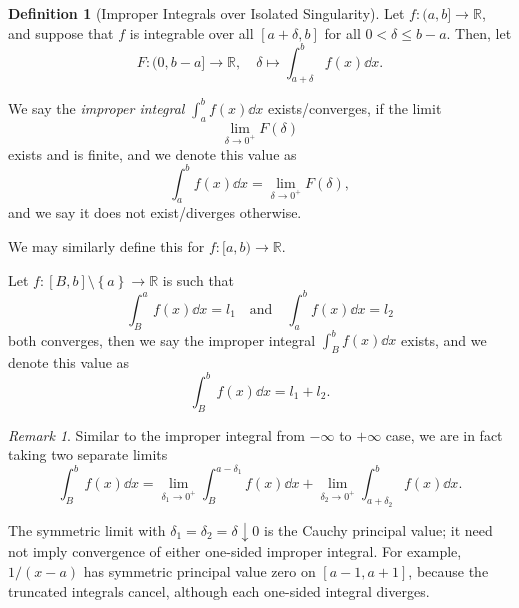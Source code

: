 \documentclass[11pt]{article}
\numberwithin{equation}{section}
\theoremstyle{definition}
\newtheorem{definition}[theorem]{Definition}
\theoremstyle{remark}
\newtheorem{remark}[theorem]{Remark}
\newcommand{\pqty}[1]{\left(#1\right)}
\newcommand{\Bqty}[1]{\left\{#1\right\}}
\newcommand{\ccintv}[2]{[#1,#2]}
\newcommand{\cointv}[2]{[#1,#2)}
\newcommand{\ocintv}[2]{(#1,#2]}
\newcommand{\functiondomain}[3]{#1:#2\to #3}
\newcommand{\function}[5]{#1:#2\to #3,\quad #4\mapsto #5}
\newcommand{\RR}{\mathbb R}
\newcommand{\plusinfty}{+\infty}
\newcommand{\minusinfty}{-\infty}
\newcommand{\qand}{\quad\text{and}\quad}
\begin{document}
\begin{definition}[Improper Integrals over Isolated Singularity]\label{analysis-unit-0194}
    \label{def:improper-integral-isolated-singularity}%
    Let \(\functiondomain{f}{\ocintv{a}{b}}{\RR}\), and suppose that \(f\) is integrable over all \(\ccintv{a + \delta}{b}\) for all \(0 < \delta \leq b - a\). Then, let
    \[
        \function{F}{\ocintv{0}{b - a}}{\RR}{\delta}{\int_{a + \delta}^{b} f\pqty{x} \dd{x}}.
    \]

    We say the \emph{improper integral} \(\int_{a}^{b} f\pqty{x} \dd{x}\) exists/converges, if the limit
    \[
        \lim_{\delta \to 0^+} F\pqty{\delta}
    \]
    exists and is finite, and we denote this value as
    \[
        \int_{a}^{b} f\pqty{x} \dd{x} = \lim_{\delta \to 0^+} F\pqty{\delta},
    \]
    and we say it does not exist/diverges otherwise.

    We may similarly define this for \(\functiondomain{f}{\cointv{a}{b}}{\RR}\).

    Let \(\functiondomain{f}{\ccintv{B}{b} \setminus \Bqty{a}}{\RR}\) is such that
    \[
        \int_{B}^{a} f\pqty{x} \dd{x} = l_1 \qand \int_{a}^{b} f\pqty{x} \dd{x} = l_2
    \]
    both converges, then we say the improper integral \(\int_{B}^{b} f\pqty{x} \dd{x}\) exists, and we denote this value as
    \[
        \int_{B}^{b} f\pqty{x} \dd{x} = l_1 + l_2.
    \]
\end{definition}

\begin{remark}\label{analysis-unit-0195}
    Similar to the improper integral from \(\minusinfty\) to \(\plusinfty\) case, we are in fact taking two separate limits
    \[
        \int_{B}^{b} f\pqty{x} \dd{x} = \lim_{\delta_1 \to 0^+} \int_{B}^{a - \delta_1} f\pqty{x} \dd{x} + \lim_{\delta_2 \to 0^+} \int_{a + \delta_2}^{b} f\pqty{x} \dd{x}.
    \]

    The symmetric limit with \(\delta_1=\delta_2=\delta\downarrow0\) is the Cauchy
principal value; it need not imply convergence of either one-sided improper integral.
For example, \(1/(x-a)\) has symmetric principal value zero on \([a-1,a+1]\),
because the truncated integrals cancel, although each one-sided integral diverges.
\end{remark}
\end{document}
